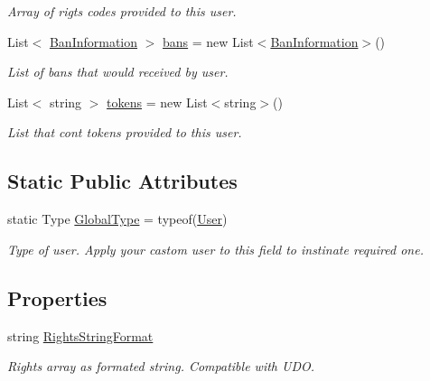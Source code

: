 \begin{DoxyCompactItemize}
\begin{DoxyCompactList}\small\item\em Array of rigts\textquotesingle{} codes provided to this user. \end{DoxyCompactList}\item 
List$<$ \mbox{\hyperlink{class_authority_controller_1_1_data_1_1_personal_1_1_ban_information}{Ban\+Information}} $>$ \mbox{\hyperlink{class_authority_controller_1_1_data_1_1_personal_1_1_user_aba2ff03e67ecf1732c4bdb625b441aac}{bans}} = new List$<$\mbox{\hyperlink{class_authority_controller_1_1_data_1_1_personal_1_1_ban_information}{Ban\+Information}}$>$()
\begin{DoxyCompactList}\small\item\em List of bans that would received by user. \end{DoxyCompactList}\item 
List$<$ string $>$ \mbox{\hyperlink{class_authority_controller_1_1_data_1_1_personal_1_1_user_a2d4cda1ba0e47546cc1d1b2c5db82434}{tokens}} = new List$<$string$>$()
\begin{DoxyCompactList}\small\item\em List that cont tokens provided to this user. \end{DoxyCompactList}\end{DoxyCompactItemize}
\subsection*{Static Public Attributes}
\begin{DoxyCompactItemize}
\item 
static Type \mbox{\hyperlink{class_authority_controller_1_1_data_1_1_personal_1_1_user_a0ea20d5524b6ae3936197f88a270c6a8}{Global\+Type}} = typeof(\mbox{\hyperlink{class_authority_controller_1_1_data_1_1_personal_1_1_user}{User}})
\begin{DoxyCompactList}\small\item\em Type of user. Apply your castom user to this field to instinate required one. \end{DoxyCompactList}\end{DoxyCompactItemize}
\subsection*{Properties}
\begin{DoxyCompactItemize}
\item 
string \mbox{\hyperlink{class_authority_controller_1_1_data_1_1_personal_1_1_user_a163bc8322a4fa64abb1f169cde75e5a5}{Rights\+String\+Format}}
\begin{DoxyCompactList}\small\item\em Rights array as formated string. Compatible with U\+DO. \end{DoxyCompactList}\end{DoxyCompactItemize}


